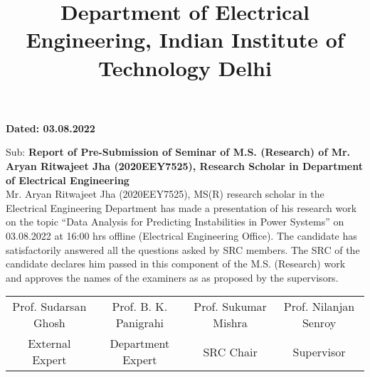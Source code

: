 \documentclass{article}
\begin{document}
	\title{\normalsize \textbf{Department of Electrical Engineering, Indian Institute of Technology Delhi}}
	\date{}
	\maketitle
	
	\vspace{-8em}
	\begin{flushright}
		\textbf{Dated: 03.08.2022} \\
	\end{flushright}
	
	\noindent
	Sub: \textbf{Report of Pre-Submission of Seminar of M.S. (Research) of Mr. Aryan Ritwajeet Jha (2020EEY7525), Research Scholar in Department of Electrical Engineering}\\[15pt]
	
	\noindent
	Mr. Aryan Ritwajeet Jha (2020EEY7525), MS(R) research scholar in the Electrical Engineering Department has made a presentation of his research work on the topic ``Data Analysis for Predicting Instabilities in Power Systems'' on 03.08.2022 at 16:00 hrs offline (Electrical Engineering Office). The candidate has satisfactorily answered all the questions asked by SRC members. The SRC of the candidate declares him passed in this component of the M.S. (Research) work and approves the names of the examiners as as proposed by the supervisors. \\
	
	\vspace{10em}
	
		\begin{table}[ht]
			\centering
			\hspace*{-5em}
			\begin{tabular}{cccc}
				Prof. Sudarsan Ghosh & Prof. B. K. Panigrahi & Prof. Sukumar Mishra & Prof. Nilanjan Senroy \\
				External Expert & Department Expert & SRC Chair & Supervisor
			\end{tabular}
		\end{table}
	
	
\end{document}
